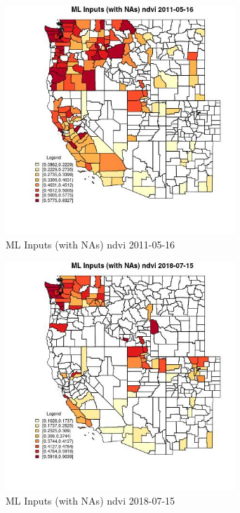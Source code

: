 \begin{figure} 
\centering  
\includegraphics[width=0.77\textwidth]{Code_Outputs/Report_ML_input_PM25_Step4_part_e_de_duplicated_aves_compiled_2019-05-21wNAs_CountyndviMean2011-05-16.jpg} 
\caption{\label{fig:Report_ML_input_PM25_Step4_part_e_de_duplicated_aves_compiled_2019-05-21wNAsCountyndviMean2011-05-16}ML Inputs (with NAs) ndvi 2011-05-16} 
\end{figure} 
 

\begin{figure} 
\centering  
\includegraphics[width=0.77\textwidth]{Code_Outputs/Report_ML_input_PM25_Step4_part_e_de_duplicated_aves_compiled_2019-05-21wNAs_CountyndviMean2018-07-15.jpg} 
\caption{\label{fig:Report_ML_input_PM25_Step4_part_e_de_duplicated_aves_compiled_2019-05-21wNAsCountyndviMean2018-07-15}ML Inputs (with NAs) ndvi 2018-07-15} 
\end{figure} 
 

